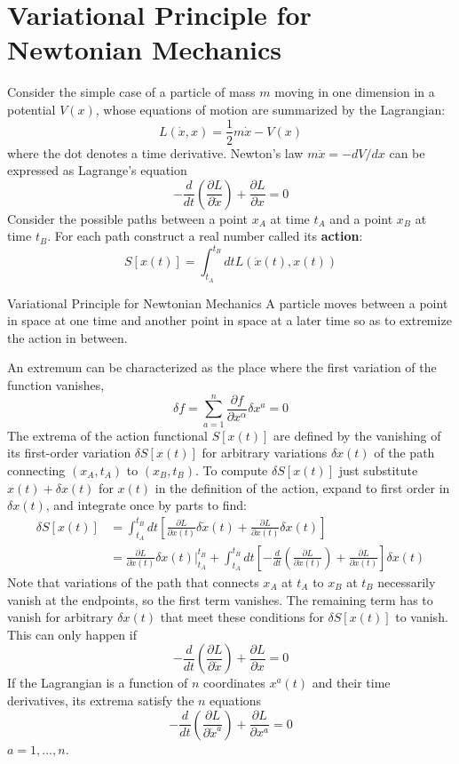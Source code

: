 \section{Variational Principle for Newtonian Mechanics}
\label{sec:varPrin}

Consider the simple case of a particle of mass $m$ moving in one dimension in a potential $V(x)$, whose equations of motion are summarized by the Lagrangian: \begin{equation*}
    L(\dot{x},x) = \frac{1}{2}m\dot{x}-V(x)
\end{equation*}
where the dot denotes a time derivative. Newton's law $m\ddot{x} = -dV/dx$ can be expressed as Lagrange's equation $$-\frac{d}{dt}\left(\frac{\partial L}{\partial \dot{x}}\right) + \frac{\partial L}{\partial x} = 0$$
Consider the possible paths between a point $x_A$ at time $t_A$ and a point $x_B$ at time $t_B$. For each path construct a real number called its \textbf{action}: $$S[x(t)] = \int_{t_A}^{t_B}dt L(\dot{x}(t),x(t))$$

\begin{thm}{Variational Principle for Newtonian Mechanics}
    A particle moves between a point in space at one time and another point in space at a later time so as to extremize the action in between.
\end{thm}


An extremum can be characterized as the place where the first variation of the function vanishes, $$\delta f = \sum_{a=1}^n\frac{\partial f}{\partial x^{\alpha}} \delta x^a = 0$$
The extrema of the action functional $S[x(t)]$ are defined by the vanishing of its first-order variation $\delta S[x(t)]$ for arbitrary variations $\delta x(t)$ of the path connecting $(x_A,t_A)$ to $(x_B,t_B)$. To compute $\delta S[x(t)]$ just substitute $x(t)+\delta x(t)$ for $x(t)$ in the definition of the action, expand to first order in $\delta x(t)$, and integrate once by parts to find: \begin{align*}
    \delta S[x(t)] &= \int_{t_A}^{t_B}dt\left[\frac{\partial L}{\partial \dot{x}(t)}\delta \dot{x}(t) + \frac{\partial L}{\partial x(t)}\delta x(t)\right] \\
    &= \frac{\partial L}{\partial \dot{x}(t)}\delta x(t)\Bigg\vert_{t_A}^{t_B} + \int_{t_A}^{t_B}dt\left[-\frac{d}{dt}\left(\frac{\partial L}{\partial \dot{x}(t)}\right)+\frac{\partial L}{\partial x(t)}\right]\delta x(t)
\end{align*}
Note that variations of the path that connects $x_A$ at $t_A$ to $x_B$ at $t_B$ necessarily vanish at the endpoints, so the first term vanishes. The remaining term has to vanish for arbitrary $\delta x(t)$ that meet these conditions for $\delta S[x(t)]$ to vanish. This can only happen if $$-\frac{d}{dt}\left(\frac{\partial L}{\partial \dot{x}}\right)+\frac{\partial L}{\partial x} = 0$$
If the Lagrangian is a function of $n$ coordinates $x^a(t)$ and their time derivatives, its extrema satisfy the $n$ equations $$-\frac{d}{dt}\left(\frac{\partial L}{\partial \dot{x}^a}\right) +\frac{\partial L}{\partial x^a} = 0$$
$a = 1,...,n$.



